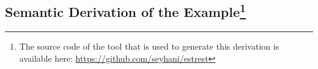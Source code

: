 \documentclass{article}
\begin{document}
\pagebreak
\begin{appendices}
    \section{Semantic Derivation of the Example\protect\footnote[1]
      {The source code of the tool that is used to
          generate this derivation is available here:
          \href{https://github.com/seyhani/estrest}
          {https://github.com/seyhani/estrest}
      }
     }
\end{appendices}
\end{document}
